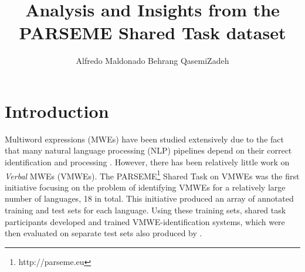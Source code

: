 \documentclass[output=paper
,modfonts
,nonflat,draftmode]{langsci/langscibook}
\title{Analysis and Insights from the PARSEME Shared Task dataset}
\author{%
 Alfredo Maldonado\affiliation{ADAPT Centre, Trinity College Dublin}\lastand 
 Behrang QasemiZadeh\affiliation{University of Düsseldorf}
}
\begin{document}
\maketitle
\label{MALDONADO-CHAPTER}
\section{Introduction} 






%

Multiword expressions (MWEs) have been studied extensively due to the fact that many natural language processing (NLP) pipelines depend on their correct identification and processing \citep{Sag2002a}. However, there has been relatively little work on \emph{Verbal} MWEs (VMWEs). The PARSEME\footnote{http://parseme.eu} Shared Task on VMWEs \citep{MWEWorkshop} was the first initiative focusing on the problem of identifying VMWEs for a relatively large number of languages, 18 in total. This initiative produced an array of annotated training and test sets for each language. Using these training sets, shared task participants developed and trained VMWE-identification systems, which were then evaluated on separate test sets also produced by . 
\end{document}

